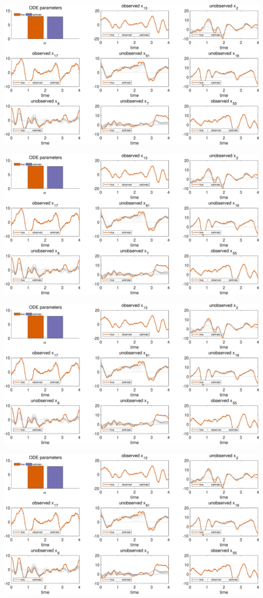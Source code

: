 {\includegraphics [width=5.5in]{VGM_for_Lorenz96_18.eps}

\includegraphics [width=5.5in]{VGM_for_Lorenz96_19.eps}

\includegraphics [width=5.5in]{VGM_for_Lorenz96_20.eps}

\includegraphics [width=5.5in]{VGM_for_Lorenz96_21.eps}

}

